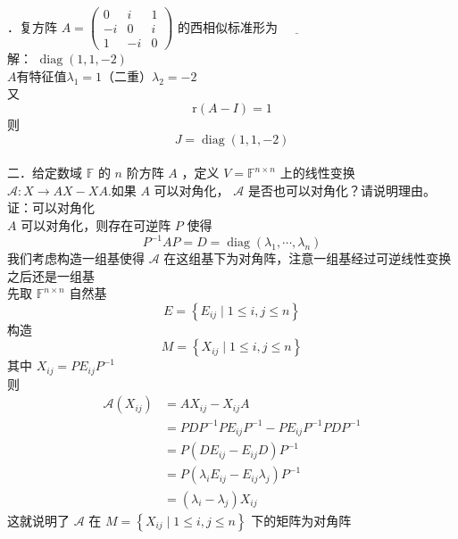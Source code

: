 \documentclass[UTF8]{ctexart}
\begin{document}
．复方阵 $A=\left(\begin{array}{ccc}0 & i & 1 \\ -i & 0 & i \\ 1 & -i & 0\end{array}\right)$ 的西相似标准形为 $\underline{\hspace{1cm}}$\\
解： $\operatorname{diag}(1,1,-2)$\\
$A$有特征值$\lambda_{1}=1$（二重）$\lambda_{2}=-2$\\
又 $$\mathrm{r}(A-I)=1$$
则
$$ J=\operatorname{diag}(1,1,-2)$$\\



\noindent 二．给定数域 $\mathbb{F}$ 的 $n$ 阶方阵 $A$ ，定义 $V=\mathbb{F}^{n \times n}$ 上的线性变换 $\mathcal{A}: X \rightarrow A X-X A$.如果 $A$ 可以对角化， $\mathcal{A}$ 是否也可以对角化？请说明理由。\\
证：可以对角化\\
$A$ 可以对角化，则存在可逆阵 $P$ 使得
 $$P^{-1} A P=D=\operatorname{diag}\left(\lambda_{1}, \cdots, \lambda_{n}\right)$$
我们考虑构造一组基使得 $\mathcal{A}$ 在这组基下为对角阵，注意一组基经过可逆线性变换之后还是一组基\\
先取 $\mathbb{F}^{n \times n}$ 自然基 $$E=\left\{E_{i j} \mid 1 \leq i, j \leq n\right\}$$
构造 
$$M=\left\{X_{i j} \mid 1 \leq i, j \leq n\right\}$$
 其中 $X_{i j}=P E_{i j} P^{-1}$\\
 则
$$
\begin{aligned}
	\mathcal{A}\left(X_{i j}\right)&=A  X_{i j}-X_{i j} A\\
	&=P D P^{-1} P E_{i j} P^{-1}-P E_{i j} P^{-1} P D P^{-1} \\
	& =P\left(D E_{i j}-E_{i j} D\right) P^{-1}\\
	&=P\left(\lambda_{i} E_{i j}-E_{i j} \lambda_{j}\right) P^{-1} \\
	& =\left(\lambda_{i}-\lambda_{j}\right) X_{i j}
\end{aligned}
$$
这就说明了 $\mathcal{A}$ 在 $M=\left\{X_{i j} \mid 1 \leq i, j \leq n\right\}$ 下的矩阵为对角阵\\
\end{document}
